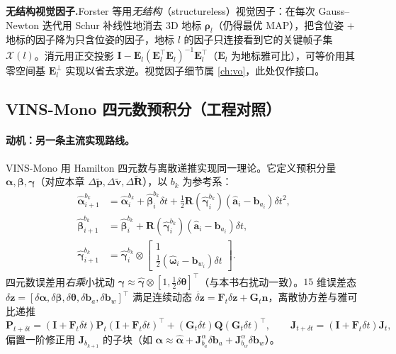 \begin{note}
\textbf{无结构视觉因子.}\;Forster 等用\emph{无结构}（structureless）视觉因子：在每次 Gauss--Newton 迭代用 Schur 补线性地消去 3D 地标 $\boldsymbol\rho_l$（仍得最优 MAP），把含位姿 $+$ 地标的因子降为只含位姿的因子，地标 $l$ 的因子只连接看到它的关键帧子集 $\mathcal X(l)$。消元用正交投影 $\mathbf I-\mathbf E_l(\mathbf E_l^\top\mathbf E_l)^{-1}\mathbf E_l^\top$（$\mathbf E_l$ 为地标雅可比），可等价用其零空间基 $\mathbf E_l^\perp$ 实现以省去求逆\cite{forster2017preintegration}。视觉因子细节属 \cref{ch:vo}，此处仅作接口。
\end{note}

\subsection{VINS-Mono 四元数预积分（工程对照）}
\label{subsec:vins-quat}

\paragraph{动机：另一条主流实现路线。}
VINS-Mono 用 Hamilton 四元数与离散递推实现同一理论\cite{qin2018vins}。它定义预积分量 $\boldsymbol\alpha,\boldsymbol\beta,\boldsymbol\gamma$（对应本章 $\Delta\tilde{\mathbf p},\Delta\tilde{\mathbf v},\Delta\tilde{\mathbf R}$），以 $b_k$ 为参考系：
\begin{align}
  \hat{\boldsymbol\alpha}^{b_k}_{i+1}&=\hat{\boldsymbol\alpha}^{b_k}_i+\hat{\boldsymbol\beta}^{b_k}_i\delta t+\tfrac12\mathbf R(\hat{\boldsymbol\gamma}^{b_k}_i)(\hat{\mathbf a}_i-\mathbf b_{a_i})\delta t^2,\nonumber\\
  \hat{\boldsymbol\beta}^{b_k}_{i+1}&=\hat{\boldsymbol\beta}^{b_k}_i+\mathbf R(\hat{\boldsymbol\gamma}^{b_k}_i)(\hat{\mathbf a}_i-\mathbf b_{a_i})\delta t,\label{eq:vins-prop}\\
  \hat{\boldsymbol\gamma}^{b_k}_{i+1}&=\hat{\boldsymbol\gamma}^{b_k}_i\otimes\begin{bmatrix}1\\\tfrac12(\hat{\boldsymbol\omega}_i-\mathbf b_{w_i})\delta t\end{bmatrix}.\nonumber
\end{align}
四元数误差用\emph{右乘}小扰动 $\boldsymbol\gamma\approx\hat{\boldsymbol\gamma}\otimes[1,\tfrac12\delta\boldsymbol\theta]^\top$（与本书右扰动一致）。$15$ 维误差态 $\delta\mathbf z=[\delta\boldsymbol\alpha,\delta\boldsymbol\beta,\delta\boldsymbol\theta,\delta\mathbf b_a,\delta\mathbf b_w]^\top$ 满足连续动态 $\dot{\delta\mathbf z}=\mathbf F_t\delta\mathbf z+\mathbf G_t\mathbf n$，离散协方差与雅可比递推
\begin{equation}
  \mathbf P_{t+\delta t}=(\mathbf I+\mathbf F_t\delta t)\mathbf P_t(\mathbf I+\mathbf F_t\delta t)^\top+(\mathbf G_t\delta t)\mathbf Q(\mathbf G_t\delta t)^\top,\qquad
  \mathbf J_{t+\delta t}=(\mathbf I+\mathbf F_t\delta t)\mathbf J_t,
  \label{eq:vins-cov}
\end{equation}
偏置一阶修正用 $\mathbf J_{b_{k+1}}$ 的子块（如 $\boldsymbol\alpha\approx\hat{\boldsymbol\alpha}+\mathbf J^\alpha_{b_a}\delta\mathbf b_a+\mathbf J^\alpha_{b_w}\delta\mathbf b_w$）。

